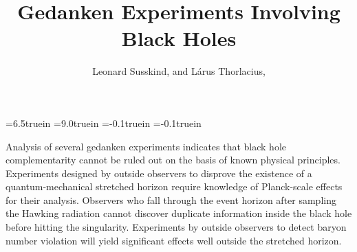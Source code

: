 


\overfullrule=0pt
\hsize=6.5truein
\vsize=9.0truein
\voffset=-0.1truein
\hoffset=-0.1truein

\def\BH{\hbox{\sevenrm bh}}
\def\half{{1\over 2}}
\def\inn{\hbox{\sevenrm in}}
\def\out{\hbox{\sevenrm out}}
\def\pa{\partial}
\def\scrip{{\cal I}^+}
\def\scrim{{\cal I}^-}
\def\scripl{{\cal I}_L^+}
\def\scripr{{\cal I}_R^+}
\def\scriml{{\cal I}_L^-}
\def\scrimr{{\cal I}_R^-}
\def\scripm{{\cal I}_{\pm}}
\def\scril{{\cal I}_L}
\def\scrir{{\cal I}_R}
\def\scripml{{\cal I}^{\pm}_L}
\def\scripmr{{\cal I}^{\pm}_R}
\def\sp{\sigma^+}
\def\sm{\sigma^-}
\def\Var{\hbox{Var}}
\def\xp{x^+}
\def\xm{x^-}
\def\yp{y^+}
\def\ym{y^-}


\vfill

\title{Gedanken Experiments Involving Black Holes}

\vfill

\author{Leonard Susskind,
and L\'arus Thorlacius,}

\vfill

\address{Department of Physics \break Stanford University, Stanford,
CA
94305-4060}

\vfill

\abstract
{\singlespace
Analysis of several gedanken experiments indicates that black hole
complementarity cannot be ruled out on the basis of known physical
principles.  Experiments designed by outside observers to disprove
the existence of a quantum-mechanical stretched horizon require
knowledge of Planck-scale effects for their analysis.  Observers who
fall through the event horizon after sampling the Hawking radiation
cannot discover duplicate information inside the black hole before
hitting the singularity.  Experiments by outside observers to detect
baryon number violation will yield significant effects well outside
the stretched horizon.}

